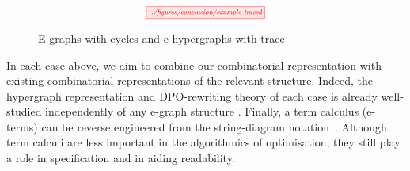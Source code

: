 \begin{figure}
	\[
	\scalebox{0.65}{
	\tikzfig{../figures/conclusion/example-traced}
	}
\]
	\caption{E-graphs with cycles and e-hypergraphs with trace}
	\label{fig:app2}
\end{figure}

In each case above,  we aim to combine our combinatorial representation with existing combinatorial representations of the relevant structure.  Indeed,  the hypergraph representation and DPO-rewriting theory of each case is already well-studied independently of any e-graph structure \cite{ghica_rewriting_2023,alvarez-picallo-functorial_2021}. %
Finally,  a term calculus (e-terms) can be reverse engineered from the string-diagram notation~\cite{ghica_structural_nominal, Heijltjes:FMCII}. Although term calculi are less important in the algorithmics of optimisation, they still play a role in specification and in aiding readability.  